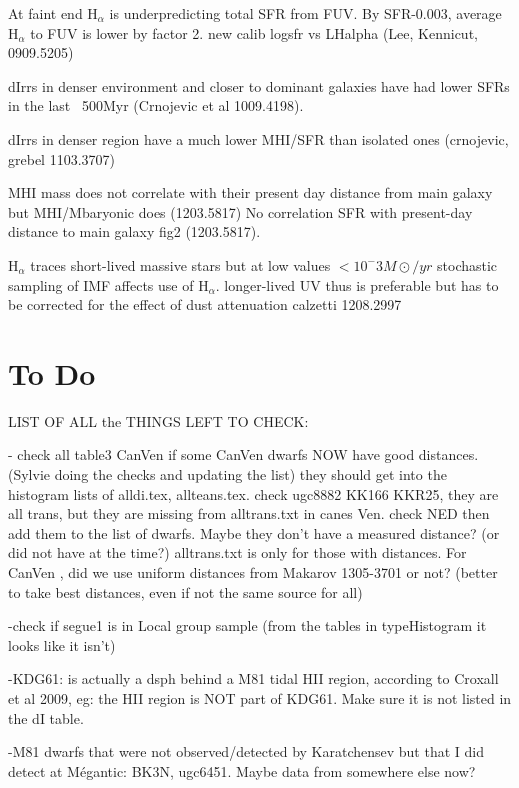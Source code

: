 \documentclass[12pt,preprint]{emulateapj}
\begin{document}
At faint end H$_\alpha$ is underpredicting total SFR from FUV. By SFR-0.003, average H$_\alpha$ to FUV is lower by factor 2. new calib logsfr vs LHalpha 
(Lee, Kennicut, 0909.5205)

dIrrs in denser environment and closer to dominant galaxies have had lower SFRs in the last ~500Myr (Crnojevic et al 1009.4198).

dIrrs in denser region have a much lower MHI/SFR than isolated ones (crnojevic, grebel 1103.3707)

MHI mass does not correlate with their present day distance from main galaxy but MHI/Mbaryonic does (1203.5817)
No correlation SFR with present-day distance to main galaxy fig2 (1203.5817).

H$_\alpha$ traces short-lived massive stars but at low values $<10^-3 M\odot/yr$ stochastic sampling of IMF affects use of H$_\alpha$. longer-lived UV thus 
is preferable but has to be corrected for the effect of dust attenuation calzetti 1208.2997



\section{To Do}

LIST OF ALL the THINGS LEFT TO CHECK:

- check all table3 CanVen if some CanVen dwarfs NOW have good distances. (Sylvie doing the checks and updating the list) they should get into 
the histogram lists of alldi.tex, allteans.tex. check ugc8882 KK166 KKR25, they are all trans, but they are missing from alltrans.txt in canes Ven. 
check NED then add them to the list of dwarfs. Maybe they don't have a measured distance? (or did not have at the time?) alltrans.txt is only for 
those with distances. For CanVen , did we use uniform distances from Makarov 1305-3701 or not? (better to take best distances, even if not the 
same source for all)

-check if segue1 is in Local group sample (from the tables in typeHistogram it looks like it isn't)

-KDG61: is actually a dsph behind a M81 tidal HII region, according to Croxall et al 2009, eg: the HII region is NOT part of KDG61. Make sure it is not listed in the dI table.

-M81 dwarfs that were not observed/detected by Karatchensev but that I did detect at M\'egantic: BK3N, ugc6451. Maybe data from somewhere else now?
\end{document}
